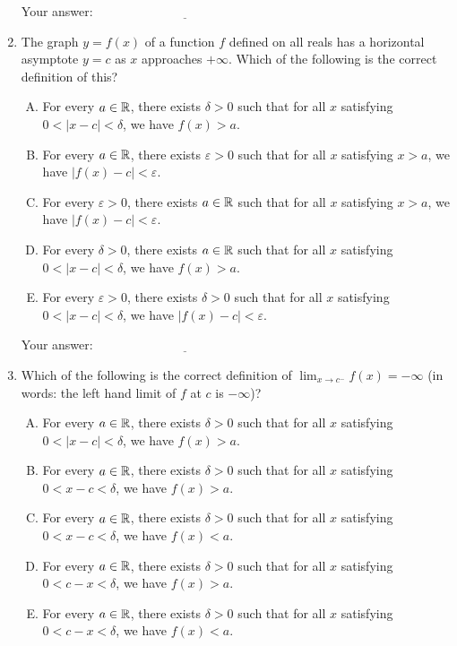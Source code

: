 \documentclass[10pt]{amsart}
\begin{document}
\begin{enumerate}
  \vspace{0.1in}
  Your answer: $\underline{\qquad\qquad\qquad\qquad\qquad\qquad\qquad}$
  \vspace{0.1in}

\item The graph $y = f(x)$ of a function $f$ defined on all reals has
  a horizontal asymptote $y = c$ as $x$ approaches $+\infty$. Which of
  the following is the correct definition of this?

  \begin{enumerate}[(A)]
  \item For every $a \in \mathbb{R}$, there exists $\delta > 0$ such that for
    all $x$ satisfying $0 < |x - c| < \delta$, we have $f(x) > a$.
  \item For every $a \in \mathbb{R}$, there exists $\varepsilon > 0$ such that
    for all $x$ satisfying $x > a$, we have $|f(x) - c| < \varepsilon$.
  \item For every $\varepsilon > 0$, there exists $a \in \mathbb{R}$ such that
    for all $x$ satisfying $x > a$, we have $|f(x) - c| < \varepsilon$.
  \item For every $\delta > 0$, there exists $a \in \mathbb{R}$ such that for
    all $x$ satisfying $0 < |x - c| < \delta$, we have $f(x) > a$.
  \item For every $\varepsilon > 0$, there exists $\delta > 0$ such
    that for all $x$ satisfying $0 < |x - c| < \delta$, we have $|f(x)
    - c| < \varepsilon$.
  \end{enumerate}

  \vspace{0.1in}
  Your answer: $\underline{\qquad\qquad\qquad\qquad\qquad\qquad\qquad}$
  \vspace{0.1in}

\item Which of the following is the correct definition of
  $\displaystyle \lim_{x \to c^-} f(x) = -\infty$ (in words: the left
  hand limit of $f$ at $c$ is $-\infty$)?

  \begin{enumerate}[(A)]
  \item For every $a \in \mathbb{R}$, there exists $\delta > 0$ such that for
    all $x$ satisfying $0 < |x - c| < \delta$, we have $f(x) > a$.
  \item For every $a \in \mathbb{R}$, there exists $\delta > 0$ such that for
    all $x$ satisfying $0 < x - c < \delta$, we have $f(x) > a$.
  \item For every $a \in \mathbb{R}$, there exists $\delta > 0$ such that for
    all $x$ satisfying $0 < x - c < \delta$, we have $f(x) < a$.
  \item For every $a \in \mathbb{R}$, there exists $\delta > 0$ such that for
    all $x$ satisfying $0 < c - x < \delta$, we have $f(x) > a$.
  \item For every $a \in \mathbb{R}$, there exists $\delta > 0$ such that for
    all $x$ satisfying $0 < c - x < \delta$, we have $f(x) < a$.
  \end{enumerate}


\end{enumerate}
\end{document}
